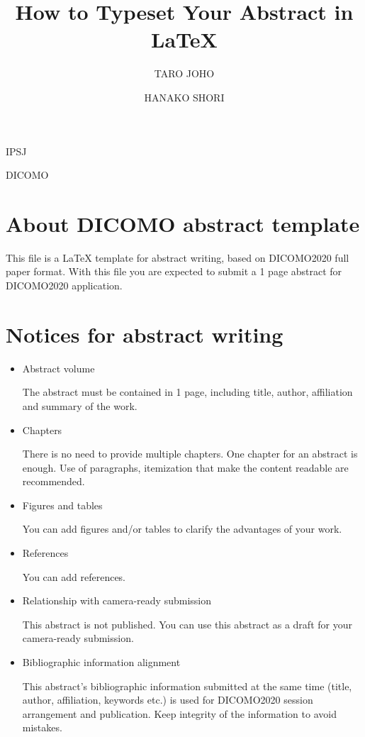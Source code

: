 \documentclass[English]{dicomopapers}
\begin{document}
\title{How to Typeset Your Abstract in {\LaTeX}}


\author{TARO JOHO}{IPSJ}
\author{HANAKO SHORI}{DICOMO}

\maketitle

\section{About DICOMO abstract template}
This file is a {\LaTeX} template for abstract writing, based on
DICOMO2020 full paper format. With this file you are expected to
submit a 1 page abstract for DICOMO2020 application.

\section{Notices for abstract writing}
\begin{itemize}
 \item Abstract volume
   
   The abstract must be contained in 1 page, including title, author,
   affiliation and summary of the work.

 \item Chapters
     
   There is no need to provide multiple chapters. One chapter for an
   abstract is enough. Use of paragraphs, itemization that make the
   content readable are recommended.

 \item Figures and tables

   You can add figures and/or tables to clarify the advantages of your work.

 \item References

  You can add references.

 \item Relationship with camera-ready submission

   This abstract is not published. You can use this abstract as a
   draft for your camera-ready submission.

 \item Bibliographic information alignment

   This abstract's bibliographic information submitted at the same
   time (title, author, affiliation, keywords etc.) is used for
   DICOMO2020 session arrangement and publication. Keep integrity of
   the information to avoid mistakes.
\end{itemize}
\end{document}
